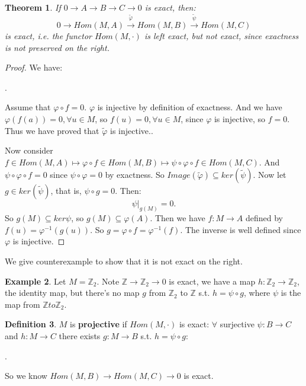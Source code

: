 \documentclass[12pt]{amsbook}
\theoremstyle{plain}
\newtheorem{theorem}{Theorem}[chapter]
\numberwithin{section}{chapter}
\numberwithin{equation}{chapter}
\theoremstyle{definition}
\newtheorem{Def}[theorem]{Definition}
\newtheorem{Ex}[theorem]{Example}
\theoremstyle{remark}
\newcommand{\sub}{\subseteq}
\newcommand{\z}{\mathbb{Z}}
\renewcommand{\phi}{\varphi}
\begin{document}
\begin{theorem}
If $0 \to A \to B \to C \to 0$ is exact, then:
$$
0 \to Hom(M,A) \overset{\tilde{\phi}}{\to} Hom(M,B) \overset{\tilde{\psi}}{\to} Hom(M,C)
$$
is exact, i.e. the functor $Hom(M,\cdot)$ is left exact, but not exact, since exactness is not preserved on the right. 
\end{theorem}

\begin{proof}
We have:
\begin{center}
. 
\end{center}
Assume that $\phi \circ f = 0$. $\phi$ is injective by definition of exactness. And we have $\phi(f(a)) = 0, \forall u \in M$, so $f(u) = 0, \forall u \in M$, since $\phi$ is injective, so $f = 0$. Thus we have proved that $\tilde{\phi}$ is injective.. 

 Now consider $f \in Hom(M,A) \mapsto \phi \circ f \in Hom(M,B) \mapsto \psi \circ \phi \circ f \in Hom(M,C)$. And $\psi \circ \phi \circ f = 0$ since $\psi \circ \phi = 0$ by exactness. So  $Image(\tilde{\phi}) \sub ker(\tilde{\psi})$. Now let $g \in ker(\tilde{\psi})$, that is, $\psi \circ g = 0$. Then:
$$
\psi\rvert_{g(M)} = 0.
$$
So $g(M) \sub ker\psi$, so $g(M) \sub \phi(A)$. Then we have $f: M \to A$ defined by $f(u) = \phi^{-1}(g(u))$. So $g = \phi \circ f = \phi^{-1}(f)$. The inverse is well defined since $\phi$ is injective. 
\end{proof}

We give counterexample to show that it is not exact on the right. 

\begin{Ex}
Let $M = \z_2$. Note $\z \to \z_2 \to 0$ is exact, we have a map $h: \z_2 \to \z_2$, the identity map, but there's no map $g$ from $\z_2$ to $\z$ s.t. $h = \psi \circ g$, where $\psi$ is the map from $\z to \z_2$. 
\end{Ex}

\begin{Def}
$M$ is \textbf{projective} if $Hom(M,\cdot)$ is exact: $\forall$ surjective $\psi:B \to C$ and $h:M \to C$ there exists $g:M \to B$ s.t. $h = \psi \circ g$:
\begin{center}
. 
\end{center}
So we know $Hom(M,B) \to Hom(M,C) \to 0$ is exact. 
\end{Def}
\end{document}
